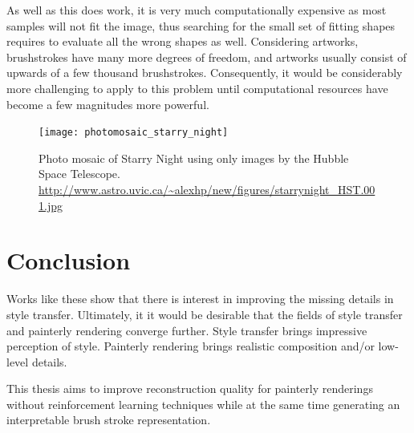 As well as this does work, it is very much computationally expensive as most samples will not fit the image, thus searching for the small set of fitting shapes requires to evaluate all the wrong shapes as well.
Considering artworks, brushstrokes have many more degrees of freedom, and artworks usually consist of upwards of a few thousand brushstrokes.
Consequently, it would be considerably more challenging to apply to this problem until computational resources have become a few magnitudes more powerful.

\begin{figure}
    \texttt{[image: photomosaic\_starry\_night]}
    \caption[]{Photo mosaic of Starry Night using only images by the Hubble Space Telescope. \url{http://www.astro.uvic.ca/~alexhp/new/figures/starrynight_HST.001.jpg}}
\end{figure}


\section{Conclusion}
Works like these show that there is interest in improving the missing details in style transfer.
Ultimately, it it would be desirable that the fields of style transfer and painterly rendering converge further.
Style transfer brings impressive perception of style.
Painterly rendering brings realistic composition and/or low-level details.

This thesis aims to improve reconstruction quality for painterly renderings without reinforcement learning techniques while at the same time generating an interpretable brush stroke representation.
